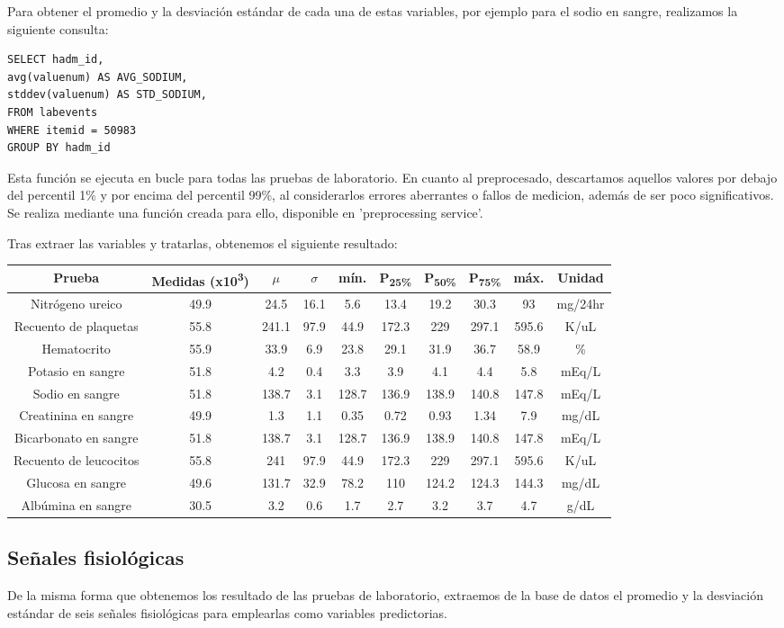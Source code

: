 \documentclass{report}
\begin{document}
Para obtener el promedio y la desviación estándar de cada una de estas
variables, por ejemplo para el sodio en sangre, realizamos la siguiente
consulta:

\begin{verbatim}
SELECT hadm_id,
avg(valuenum) AS AVG_SODIUM,
stddev(valuenum) AS STD_SODIUM,
FROM labevents
WHERE itemid = 50983
GROUP BY hadm_id
\end{verbatim}
Esta función se ejecuta en bucle para todas las pruebas de laboratorio.
En cuanto al preprocesado, descartamos aquellos valores por debajo del
percentil 1\% y por encima del percentil 99\%, al considerarlos errores
aberrantes o fallos de medicion, además de ser poco significativos. Se
realiza mediante una función creada para ello, disponible en
'preprocessing service'.

Tras extraer las variables y tratarlas, obtenemos el siguiente
resultado:



\begin{longtable}[]{@{}cccccccccc@{}}
\toprule
Prueba  & Medidas (x10\textsuperscript{3}) & $\mu$ &
$\sigma$ & mín. &  P\textsubscript{25\%} & 
 P\textsubscript{50\%} &   P\textsubscript{75\%} & máx. & Unidad \tabularnewline
\midrule
\endhead
Nitrógeno ureico & 49.9 & 24.5 & 16.1 & 5.6 & 13.4 & 19.2 &
30.3 & 93 & mg/24hr\tabularnewline
Recuento de plaquetas & 55.8 & 241.1 & 97.9 & 44.9 & 172.3 & 229 & 297.1
& 595.6 & K/uL\tabularnewline
Hematocrito & 55.9 & 33.9 & 6.9 & 23.8 & 29.1 & 31.9 & 36.7 & 58.9 &
\%\tabularnewline
Potasio en sangre & 51.8 & 4.2 & 0.4 & 3.3 & 3.9 & 4.1 & 4.4 & 5.8 &
mEq/L\tabularnewline
Sodio en sangre & 51.8 & 138.7 & 3.1 & 128.7 & 136.9 & 138.9 & 140.8 &
147.8 & mEq/L\tabularnewline
Creatinina en sangre & 49.9 & 1.3 & 1.1 & 0.35 & 0.72 & 0.93 & 1.34 &
7.9 & mg/dL\tabularnewline
Bicarbonato en sangre & 51.8 & 138.7 & 3.1 & 128.7 & 136.9 & 138.9 &
140.8 & 147.8 & mEq/L\tabularnewline
Recuento de leucocitos & 55.8 & 241 & 97.9 & 44.9 & 172.3 & 229 & 297.1
& 595.6 & K/uL\tabularnewline
Glucosa en sangre & 49.6 & 131.7 & 32.9 & 78.2 & 110 & 124.2 & 124.3 &
144.3 & mg/dL\tabularnewline
Albúmina en sangre & 30.5 & 3.2 & 0.6 & 1.7 & 2.7 & 3.2 & 3.7 & 4.7 &
g/dL\tabularnewline
\bottomrule
\end{longtable}
\subsection{Señales fisiológicas}

De la misma forma que obtenemos los resultado de las pruebas de
laboratorio, extraemos de la base de datos el promedio y la desviación
estándar de seis señales fisiológicas para emplearlas como variables
predictorias.
\end{document}
